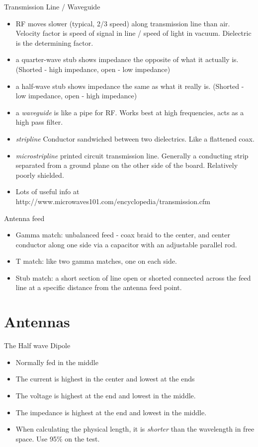 \documentclass{beamer}
\begin{document}
\begin{frame}{Transmission Line / Waveguide}{}
\begin{itemize}
\item RF moves slower (typical, 2/3 speed) along transmission line than air.  Velocity factor is speed of signal in line / speed of light in vacuum.  Dielectric is the determining factor.
\item a {quarter-wave stub} shows impedance the opposite of what it actually is.  (Shorted - high impedance, open - low impedance)
\item a {half-wave stub} shows impedance the same as what it really is. (Shorted - low impedance, open - high impedance)
\item a {\em waveguide} is like a pipe for RF.  Works best at high frequencies, acts as a high pass filter.  
\item {\em stripline} Conductor sandwiched between two dielectrics.  Like a flattened coax.
\item {\em microstripline} printed circuit transmission line.  Generally a conducting strip separated from a ground plane on the other side of the board. Relatively poorly shielded.
\item Lots of useful info at http://www.microwaves101.com/encyclopedia/transmission.cfm

\end{itemize}
\end{frame}

\begin{frame}{Antenna feed}{}
\begin{itemize}
\item Gamma match: unbalanced feed - coax braid to the center, and center conductor along one side via a capacitor with an adjustable parallel rod. 
\item T match: like two gamma matches, one on each side.
\item Stub match: a short section of line open or shorted connected across the feed line at a specific distance from the antenna feed point.
\end{itemize}
\end{frame}

\section{Antennas}

\begin{frame}{The Half wave Dipole}{}
\begin{itemize}
\item Normally fed in the middle
\item The current is highest in the center and lowest at the ends
\item The voltage is highest at the end and lowest in the middle.
\item The impedance is highest at the end and lowest in the middle.
\item When calculating the physical length, it is {\em shorter} than the wavelength in free space.  Use 95\% on the test.
\end{itemize}
\end{frame}
\end{document}
